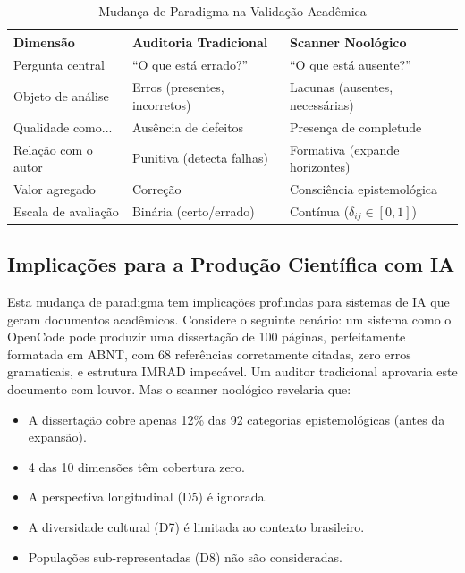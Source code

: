 \begin{table}[H]
\centering
\caption{Mudança de Paradigma na Validação Acadêmica}
\label{tab:paradigm-shift}
\begin{tabular}{p{4.5cm}p{4.5cm}p{4.5cm}}
\toprule
\textbf{Dimensão} & \textbf{Auditoria Tradicional} & \textbf{Scanner Noológico} \\
\midrule
Pergunta central & ``O que está errado?'' & ``O que está ausente?'' \\
Objeto de análise & Erros (presentes, incorretos) & Lacunas (ausentes, necessárias) \\
Qualidade como... & Ausência de defeitos & Presença de completude \\
Relação com o autor & Punitiva (detecta falhas) & Formativa (expande horizontes) \\
Valor agregado & Correção & Consciência epistemológica \\
Escala de avaliação & Binária (certo/errado) & Contínua ($\delta_{ij} \in [0,1]$) \\
\bottomrule
\end{tabular}
\end{table}

\subsection{Implicações para a Produção Científica com IA}

Esta mudança de paradigma tem implicações profundas para sistemas de IA que geram documentos acadêmicos. Considere o seguinte cenário: um sistema como o OpenCode pode produzir uma dissertação de 100 páginas, perfeitamente formatada em ABNT, com 68 referências corretamente citadas, zero erros gramaticais, e estrutura IMRAD impecável. Um auditor tradicional aprovaria este documento com louvor. Mas o scanner noológico revelaria que:

\begin{itemize}
  \item A dissertação cobre apenas 12\% das 92 categorias epistemológicas (antes da expansão).
  \item 4 das 10 dimensões têm cobertura zero.
  \item A perspectiva longitudinal (D5) é ignorada.
  \item A diversidade cultural (D7) é limitada ao contexto brasileiro.
  \item Populações sub-representadas (D8) não são consideradas.
\end{itemize}

